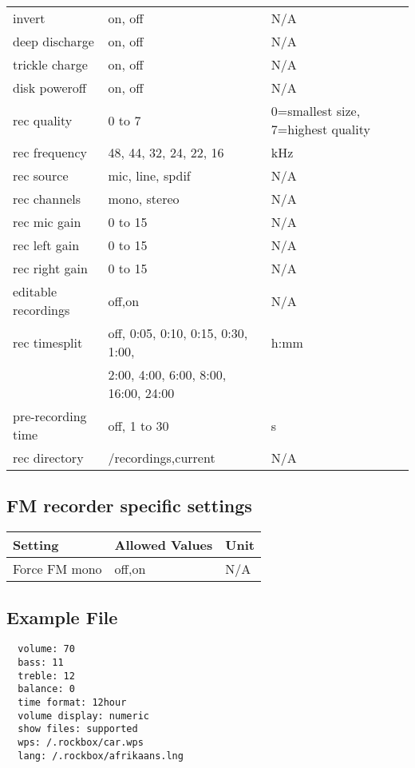 \begin{center}
\begin{longtable}{@{}lll@{}}
     invert & on, off & N/A\\
     deep discharge & on, off & N/A\\
     trickle charge & on, off & N/A\\
     disk poweroff & on, off & N/A\\
     rec quality & 0 to 7 & 0=smallest size, 7=highest quality\\
     rec frequency & 48, 44, 32, 24, 22, 16 & kHz\\
     rec source & mic, line, spdif & N/A\\
     rec channels & mono, stereo & N/A\\
     rec mic gain & 0 to 15 & N/A\\
     rec left gain & 0 to 15 & N/A\\
     rec right gain & 0 to 15 & N/A\\
     editable recordings & off,on & N/A\\
     rec timesplit & off, 0:05, 0:10, 0:15, 0:30, 1:00, & h:mm\\
                   & 2:00, 4:00, 6:00, 8:00, 16:00, 24:00 & \\
     pre-recording time & off, 1 to 30 & s\\
     rec directory & /recordings,current & N/A\\\bottomrule
    \end{longtable}
\end{center}

\subsection{FM recorder specific settings}
\begin{center}
  \begin{tabular}{@{}lll@{}}\toprule
    \textbf{Setting} & \textbf{Allowed Values} & \textbf{Unit}\\\midrule
    Force FM mono & off,on & N/A\\\bottomrule
  \end{tabular}
\end{center}

\subsection{Example File}
\begin{verbatim}
  volume: 70
  bass: 11
  treble: 12
  balance: 0
  time format: 12hour
  volume display: numeric
  show files: supported
  wps: /.rockbox/car.wps
  lang: /.rockbox/afrikaans.lng
\end{verbatim}

